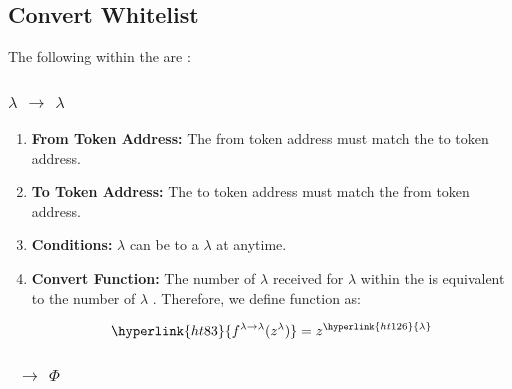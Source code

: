 \documentclass[class=article, crop=false]{standalone}
\begin{document}

\subsection{Convert Whitelist} 

The following  within the  are :

\subsubsection{$\lambda$ $\rightarrow$ $\lambda$}

\begin{enumerate}
    \item \textbf{From Token Address:} The from token address must match the to token address.
    
    \item \textbf{To Token Address:} The to token address must match the from token address.
    
    \item \textbf{Conditions:}  \hyperlink{ht126}{$\lambda$} can be  to a \hyperlink{ht126}{$\lambda$}  at anytime. 
    
    \item \textbf{Convert Function:} The number of \hyperlink{ht126}{$\lambda$} received for   \hyperlink{ht126}{$\lambda$} within the  is equivalent to the number of \hyperlink{ht126}{$\lambda$} . Therefore, we define function as:
    
        $$
            \hyperlink{ht83}{f^{\lambda \rightarrow \lambda}(z^{\lambda})} = 
                z^{\hyperlink{ht126}{\lambda}}
        $$

\end{enumerate}

\subsubsection{\Bean\ $\rightarrow$ $\Phi$}
\end{document}
